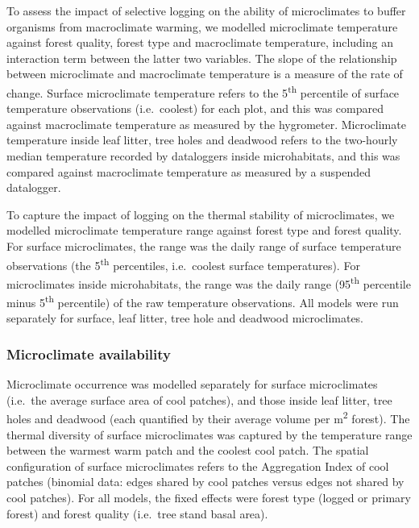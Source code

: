 \documentclass[12pt,a4paper,]{report}
\theoremstyle{definition}
\theoremstyle{definition}
\theoremstyle{definition}
\theoremstyle{remark}
\begin{document}
To assess the impact of selective logging on the ability of
microclimates to buffer organisms from macroclimate warming, we modelled
microclimate temperature against forest quality, forest type and
macroclimate temperature, including an interaction term between the
latter two variables. The slope of the relationship between microclimate
and macroclimate temperature is a measure of the rate of change. Surface
microclimate temperature refers to the 5\textsuperscript{th} percentile
of surface temperature observations (i.e.~coolest) for each plot, and
this was compared against macroclimate temperature as measured by the
hygrometer. Microclimate temperature inside leaf litter, tree holes and
deadwood refers to the two-hourly median temperature recorded by
dataloggers inside microhabitats, and this was compared against
macroclimate temperature as measured by a suspended datalogger.

To capture the impact of logging on the thermal stability of
microclimates, we modelled microclimate temperature range against forest
type and forest quality. For surface microclimates, the range was the
daily range of surface temperature observations (the
5\textsuperscript{th} percentiles, i.e.~coolest surface temperatures).
For microclimates inside microhabitats, the range was the daily range
(95\textsuperscript{th} percentile minus 5\textsuperscript{th}
percentile) of the raw temperature observations. All models were run
separately for surface, leaf litter, tree hole and deadwood
microclimates.

\subsubsection*{Microclimate
availability}\label{microclimate-availability}

Microclimate occurrence was modelled separately for surface
microclimates (i.e.~the average surface area of cool patches), and those
inside leaf litter, tree holes and deadwood (each quantified by their
average volume per m\textsuperscript{2} forest). The thermal diversity
of surface microclimates was captured by the temperature range between
the warmest warm patch and the coolest cool patch. The spatial
configuration of surface microclimates refers to the Aggregation Index
of cool patches (binomial data: edges shared by cool patches versus
edges not shared by cool patches). For all models, the fixed effects
were forest type (logged or primary forest) and forest quality
(i.e.~tree stand basal area).
\end{document}
